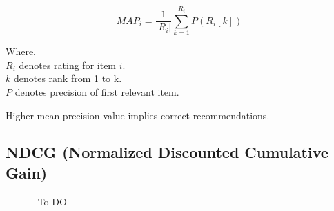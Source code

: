 \begin{equation}
MAP_{i} = \frac{1}{\vert R_{i} \vert} \sum_{k=1}^{\vert R_{i} \vert} { P( R_{i}[k]) }
\label{eq:map_at_k}
\end{equation}

\noindent Where, \\
$R_{i}$ denotes rating for item $i$. \\
$k$ denotes rank from 1 to k.\\
$P$ denotes precision of first relevant item.

\noindent Higher mean precision value implies correct recommendations.
\subsection{NDCG (Normalized Discounted Cumulative Gain)}
--------- To DO ---------